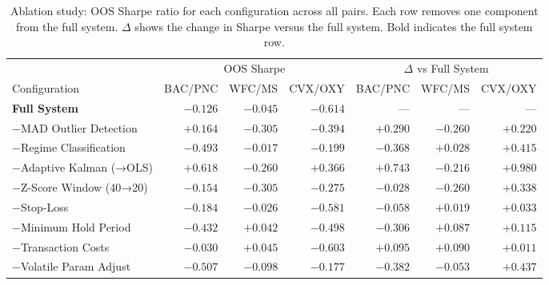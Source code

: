 \begin{table}[t]
\centering
\caption{Ablation study: OOS Sharpe ratio for each configuration across all pairs.
Each row removes one component from the full system.
$\Delta$ shows the change in Sharpe versus the full system.
Bold indicates the full system row.}
\label{tab:full_ablation}
\small
\begin{tabular}{l rrr rrr}
\toprule
 & \multicolumn{3}{c}{OOS Sharpe} & \multicolumn{3}{c}{$\Delta$ vs Full System} \\
\cmidrule(lr){2-4} \cmidrule(lr){5-7}
Configuration & BAC/PNC & WFC/MS & CVX/OXY & BAC/PNC & WFC/MS & CVX/OXY \\
\midrule
\textbf{Full System} & $-0.126$ & $-0.045$ & $-0.614$ & — & — & — \\
−MAD Outlier Detection & $+0.164$ & $-0.305$ & $-0.394$ & $+0.290$ & $-0.260$ & $+0.220$ \\
−Regime Classification & $-0.493$ & $-0.017$ & $-0.199$ & $-0.368$ & $+0.028$ & $+0.415$ \\
−Adaptive Kalman (→OLS) & $+0.618$ & $-0.260$ & $+0.366$ & $+0.743$ & $-0.216$ & $+0.980$ \\
−Z-Score Window (40→20) & $-0.154$ & $-0.305$ & $-0.275$ & $-0.028$ & $-0.260$ & $+0.338$ \\
−Stop-Loss & $-0.184$ & $-0.026$ & $-0.581$ & $-0.058$ & $+0.019$ & $+0.033$ \\
−Minimum Hold Period & $-0.432$ & $+0.042$ & $-0.498$ & $-0.306$ & $+0.087$ & $+0.115$ \\
−Transaction Costs & $-0.030$ & $+0.045$ & $-0.603$ & $+0.095$ & $+0.090$ & $+0.011$ \\
−Volatile Param Adjust & $-0.507$ & $-0.098$ & $-0.177$ & $-0.382$ & $-0.053$ & $+0.437$ \\
\bottomrule
\end{tabular}
\end{table}
